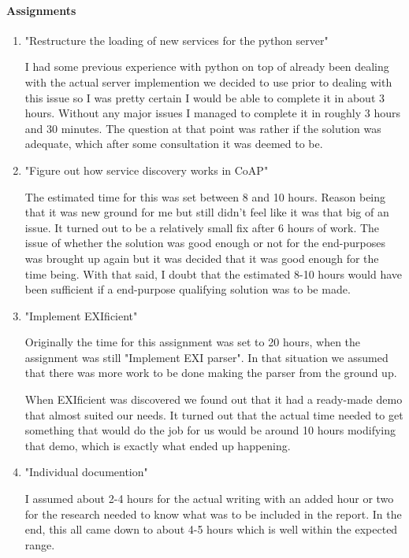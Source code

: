 \paragraph{Assignments}
\begin{enumerate}
\item{"Restructure the loading of new services for the python server"}

I had some previous experience with python on top of already been dealing with the actual server implemention we decided to use prior to dealing with this issue so I was pretty certain I would be able to complete it in about 3 hours.
Without any major issues I managed to complete it in roughly 3 hours and 30 minutes. The question at that point was rather if the solution was adequate, which after some consultation it was deemed to be.

\item {"Figure out how service discovery works in CoAP"}

The estimated time for this was set between 8 and 10 hours. Reason being that it was new ground for me but still didn't feel like it was that big of
an issue. It turned out to be a relatively small fix after 6 hours of work. The issue of whether the solution was good enough or not for the end-purposes was brought up again but it was decided that it was good enough for the time being.
With that said, I doubt that the estimated 8-10 hours would have been sufficient if a end-purpose qualifying solution was to be made. 

\item {"Implement EXIficient"}

Originally the time for this assignment was set to 20 hours, when the assignment was still "Implement EXI parser". In that situation we assumed that there was more work to be done making the parser from the ground up.

When EXIficient was discovered we found out that it had a ready-made demo that almost suited our needs. It turned out that the actual time needed to get something that would do the job for us would be around 10 hours modifying that demo, which is exactly what ended up happening.

\item {"Individual documention"}

I assumed about 2-4 hours for the actual writing with an added hour or two for the research needed to know what was to be included in the report. In the end, this all came down to about 4-5 hours which is well within the expected range.

\end{enumerate}

